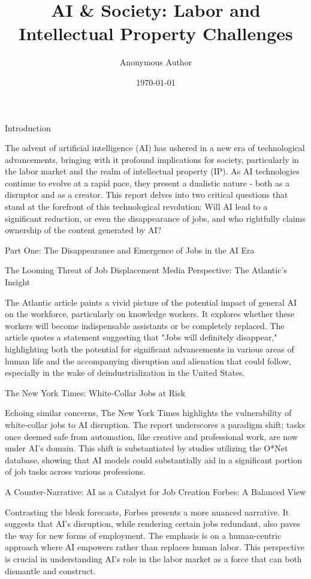 \documentclass[11pt]{article}
\title{AI \& Society: Labor and Intellectual Property Challenges}
\author{Anonymous Author}
\date{\today}
\begin{document}
\maketitle

Introduction

The advent of artificial intelligence (AI) has ushered in a new era of technological advancements, bringing with it profound implications for society, particularly in the labor market and the realm of intellectual property (IP). As AI technologies continue to evolve at a rapid pace, they present a dualistic nature - both as a disruptor and as a creator. This report delves into two critical questions that stand at the forefront of this technological revolution: Will AI lead to a significant reduction, or even the disappearance of jobs, and who rightfully claims ownership of the content generated by AI?

Part One: The Disappearance and Emergence of Jobs in the AI Era

The Looming Threat of Job Displacement
Media Perspective: The Atlantic’s Insight

The Atlantic article paints a vivid picture of the potential impact of general AI on the workforce, particularly on knowledge workers. It explores whether these workers will become indispensable assistants or be completely replaced. The article quotes a statement suggesting that "Jobs will definitely disappear," highlighting both the potential for significant advancements in various areas of human life and the accompanying disruption and alienation that could follow, especially in the wake of deindustrialization in the United States.

The New York Times: White-Collar Jobs at Risk

Echoing similar concerns, The New York Times highlights the vulnerability of white-collar jobs to AI disruption. The report underscores a paradigm shift; tasks once deemed safe from automation, like creative and professional work, are now under AI’s domain. This shift is substantiated by studies utilizing the O*Net database, showing that AI models could substantially aid in a significant portion of job tasks across various professions.

A Counter-Narrative: AI as a Catalyst for Job Creation
Forbes: A Balanced View

Contrasting the bleak forecasts, Forbes presents a more nuanced narrative. It suggests that AI’s disruption, while rendering certain jobs redundant, also paves the way for new forms of employment. The emphasis is on a human-centric approach where AI empowers rather than replaces human labor. This perspective is crucial in understanding AI’s role in the labor market as a force that can both dismantle and construct.
\end{document}
